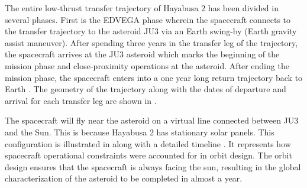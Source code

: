 The entire low-thrust transfer trajectory of Hayabusa 2 has been divided in several phases. First is the \gls{EDVEGA} phase wherein the spacecraft connects to the transfer trajectory to the asteroid JU3 via an Earth swing-by (Earth gravity assist maneuver). After spending three years in the transfer leg of the trajectory, the spacecraft arrives at the JU3 asteroid which marks the beginning of the mission phase and close-proximity operations at the asteroid. After ending the mission phase, the spacecraft enters into a one year long return trajectory back to Earth \cite{ju3lowthrust}. The geometry of the trajectory along with the dates of departure and arrival for each transfer leg are shown in .

The spacecraft will fly near the asteroid on a virtual line connected between JU3 and the Sun. This is because Hayabusa 2 has stationary solar panels. This configuration is illustrated in  along with a detailed timeline \cite{ju3traj}. It represents how spacecraft operational constraints were accounted for in orbit design. The orbit design ensures that the spacecraft is always facing the sun, resulting in the global characterization of the asteroid to be completed in almost a year.

